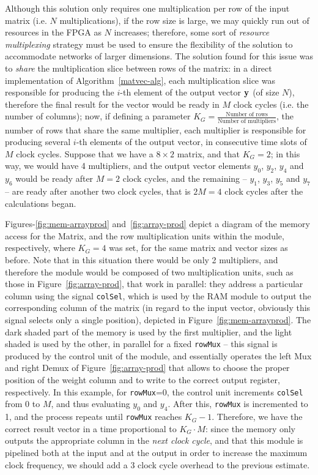 Although this solution only requires one multiplication per row of the input matrix (i.e. $N$ multiplications), if the row size is large, we may quickly run out of resources in the FPGA
as $N$ increases; therefore, some sort of \textit{resource multiplexing} strategy must be used to ensure the flexibility of the solution to accommodate networks of larger dimensions.
The solution found for this issue was to \emph{share} the multiplication slice between rows of the matrix: in a direct implementation of Algorithm~\ref{matvec-alg}, each
multiplication slice was responsible for producing the $i$-th element of the output vector $\mathbf{y}$ (of size $N$), therefore the final result for the vector would be ready in $M$
clock cycles (i.e. the number of columns); now, if defining a parameter $K_G = \frac{\text{Number of rows}}{\text{Number of multipliers}}$, the number of rows that share the
same multiplier, each multiplier is responsible for producing several $i$-th elements of the output vector, in consecutive time slots of $M$ clock cycles. Suppose that we
have a $8\times2$ matrix, and that $K_G = 2$; in this way, we would have 4 multipliers, and the output vector elements $y_0$, $y_2$, $y_4$ and $y_6$ would be ready after $M=2$
clock cycles, and the remaining -- $y_1$, $y_3$, $y_5$ and $y_7$ --  are ready after another two clock cycles, that is $2M = 4$ clock cycles after the calculations began.

Figures-\ref{fig:mem-arrayprod} and~\ref{fig:array-prod} depict a diagram of the memory access for the Matrix, and the row multiplication units within the module, respectively,
where $K_G = 4$ was set, for the same matrix and vector sizes as before. Note that in this situation there would be only 2 multipliers, and therefore the module would be composed of two
multiplication units, such as those in Figure~\ref{fig:array-prod}, that work in parallel: they address a particular column using the signal \verb+colSel+, which is used by the RAM
module to output the corresponding column of the matrix (in regard to the input vector, obviously this signal selects only a single position), depicted in Figure~\ref{fig:mem-arrayprod}.
The dark shaded part of the memory is used by the first multiplier, and the light shaded is used by the other, in parallel for a fixed \verb+rowMux+ -- this signal is produced by the
control unit of the module, and essentially operates the left Mux and right Demux of Figure~\ref{fig:array-prod} that allows to choose the proper position of the weight column and to
write to the correct output register, respectively. In this example, for \verb+rowMux+=0, the control unit increments \verb+colSel+ from 0 to $M$, and thus evaluating $y_0$ and $y_4$.
After this, \verb+rowMux+ is incremented to 1, and the process repeats until \verb+rowMux+ reaches $K_G-1$. Therefore, we have the correct result vector in a time proportional to $K_G \cdot M$:
since the memory only outputs the appropriate column in the \emph{next clock cycle}, and that this module is pipelined both at the input and at the output in order to increase the maximum clock
frequency, we should add a 3 clock cycle overhead to the previous estimate.


